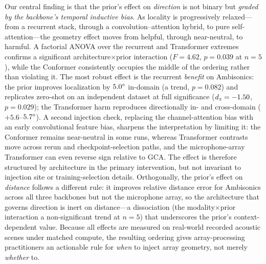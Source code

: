 Our central finding is that the prior's effect on \emph{direction} is not binary
but \emph{graded by the backbone's temporal inductive bias}. As locality is
progressively relaxed---from a recurrent stack, through a convolution--attention
hybrid, to pure self-attention---the geometry effect moves from helpful, through
near-neutral, to harmful. A factorial ANOVA over the recurrent and Transformer
extremes confirms a significant architecture$\times$prior interaction
($F=4.62$, $p=0.039$ at $n=5$), while the Conformer consistently occupies the
middle of the ordering rather than violating it. The most robust effect is the
recurrent \emph{benefit} on Ambisonics: the prior improves localization by
$5.0^\circ$ in-domain (a trend, $p=0.082$) and replicates zero-shot on an
independent dataset at full significance ($d_z=-1.50$, $p=0.029$); the
Transformer harm reproduces directionally in- and cross-domain
($+5.6$--$5.7^\circ$). A second injection check, replacing the
channel-attention bias with an early convolutional feature bias, sharpens the
interpretation by limiting it: the Conformer remains near-neutral in some runs,
whereas Transformer contrasts move across rerun and checkpoint-selection paths,
and the microphone-array Transformer can even reverse sign relative to GCA. The
effect is therefore structured by architecture in the primary intervention, but
not invariant to injection site or training-selection details.
Orthogonally, the prior's effect on \emph{distance} follows a different rule: it
improves relative distance error for Ambisonics across all three backbones but not
the microphone array, so the architecture that governs direction is inert on
distance---a dissociation (the modality$\times$prior interaction a non-significant
trend at $n=5$) that underscores the prior's context-dependent value. Because all
effects are measured on real-world recorded acoustic scenes under matched compute,
the resulting ordering gives array-processing practitioners an actionable rule for
\emph{when} to inject array geometry, not merely \emph{whether} to.

